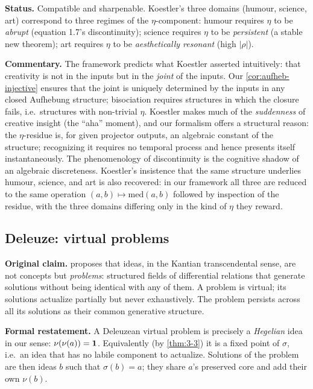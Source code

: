 \textbf{Status.} Compatible and sharpenable. Koestler's three
domains (humour, science, art) correspond to three regimes of the
$\eta$-component: humour requires $\eta$ to be \emph{abrupt}
(equation 1.7's discontinuity); science requires $\eta$ to be
\emph{persistent} (a stable new theorem); art requires $\eta$ to be
\emph{aesthetically resonant} (high $|\rho|$).

\textbf{Commentary.} The framework predicts what Koestler asserted
intuitively: that creativity is not in the inputs but in the
\emph{joint} of the inputs. Our \cref{cor:aufheb-injective} ensures
that the joint is uniquely determined by the inputs in any closed
Aufhebung structure; bisociation requires structures in which the
closure fails, i.e.\ structures with non-trivial $\eta$.  Koestler
makes much of the \emph{suddenness} of creative insight (the
``aha'' moment), and our formalism offers a structural reason: the
$\eta$-residue is, for given projector outputs, an algebraic constant
of the structure; recognizing it requires no temporal process and
hence presents itself instantaneously. The phenomenology of
discontinuity is the cognitive shadow of an algebraic discreteness.
Koestler's insistence that the same structure underlies humour,
science, and art is also recovered: in our framework all three are
reduced to the same operation $(a,b)\mapsto\mathrm{med}(a,b)$ followed
by inspection of the residue, with the three domains differing only
in the kind of $\eta$ they reward.

\subsection*{Deleuze: virtual problems}

\textbf{Original claim.} \citet{Deleuze1968} proposes that ideas, in
the Kantian transcendental sense, are not concepts but
\emph{problems}: structured fields of differential relations that
generate solutions without being identical with any of them. A
problem is virtual; its solutions actualize partially but never
exhaustively. The problem persists across all its solutions as their
common generative structure.

\textbf{Formal restatement.} A Deleuzean virtual problem is precisely
a \emph{Hegelian} idea in our sense: $\nu(\nu(a))=\mathbf{1}$. Equivalently
(by \cref{thm:3-3}) it is a fixed point of $\sigma$, i.e.\ an idea
that has no labile component to actualize. Solutions of the problem
are then ideas $b$ such that $\sigma(b)=a$; they share $a$'s
preserved core and add their own $\nu(b)$.

